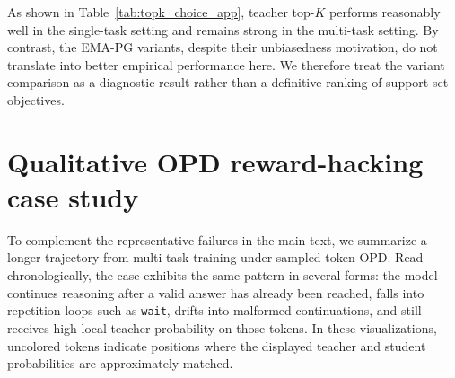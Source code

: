 \documentclass{article}
\begin{document}
\begin{table}[H]
\begin{subtable}{\linewidth}
\centering
{}
\caption{Five top-$K$ variants in the multi-task setting. We report pass@1 for all math reasoning benchmarks. The final column averages pass@1 metrics only.}
\label{tab:kl_expectation_multi}
\end{subtable}

\caption{Ablation of five top-$K$ variants under single-task and multi-task settings.}
\label{tab:topk_choice_app}
\end{table}
As shown in Table~\ref{tab:topk_choice_app}, teacher top-$K$ performs reasonably well in the single-task setting and remains strong in the multi-task setting. By contrast, the EMA-PG variants, despite their unbiasedness motivation, do not translate into better empirical performance here. We therefore treat the variant comparison as a diagnostic result rather than a definitive ranking of support-set objectives.

\section{Qualitative OPD reward-hacking case study}
\label{app:case_study}
\raggedbottom
To complement the representative failures in the main text, we summarize a longer trajectory from multi-task training under sampled-token OPD. Read chronologically, the case exhibits the same pattern in several forms: the model continues reasoning after a valid answer has already been reached, falls into repetition loops such as \texttt{wait}, drifts into malformed continuations, and still receives high local teacher probability on those tokens. In these visualizations, uncolored tokens indicate positions where the displayed teacher and student probabilities are approximately matched.
\end{document}

